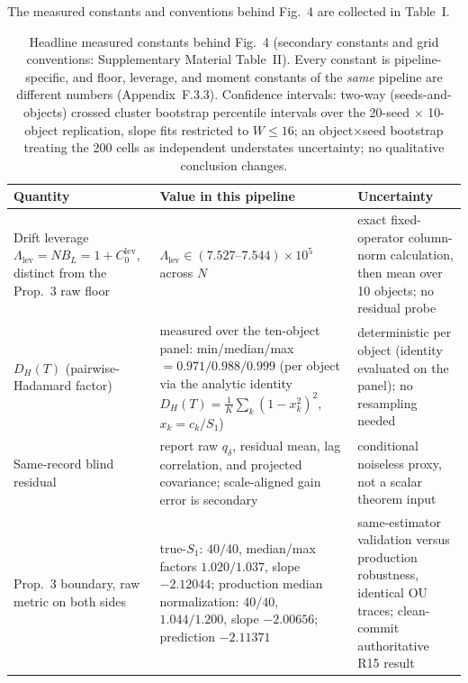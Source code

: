 The measured constants and conventions behind Fig.~4 are collected in Table~I.

\begin{table}[!t]
\centering
\caption{Headline measured constants behind Fig.~4 (secondary constants and grid conventions: Supplementary Material Table~II). Every constant is pipeline-specific, and floor, leverage, and moment constants of the \emph{same} pipeline are different numbers (Appendix~F.3.3). Confidence intervals: two-way (seeds-and-objects) crossed cluster bootstrap percentile intervals over the 20-seed $\times$ 10-object replication, slope fits restricted to $W\le16$; an object$\times$seed bootstrap treating the 200 cells as independent understates uncertainty; no qualitative conclusion changes.}
\label{tab:constants}
\begin{tabular}{@{}p{}p{}p{}@{}}
\toprule
Quantity & Value in this pipeline & Uncertainty \\
\midrule
Drift leverage $\Lambda_{\mathrm{lev}}=NB_L=1+C_0^{\mathrm{lev}}$, distinct from the Prop.~3 raw floor & $\Lambda_{\mathrm{lev}} \in (7.527\text{--}7.544)\times10^{5}$ across $N$ & exact fixed-operator column-norm calculation, then mean over 10 objects; no residual probe \\
\addlinespace
$D_H(T)$ (pairwise-Hadamard factor) & measured over the ten-object panel: min/median/max $=0.971/0.988/0.999$ (per object via the analytic identity $D_H(T)=\frac{1}{K}\sum_k(1-x_k^2)^2$, $x_k=c_k/S_1$) & deterministic per object (identity evaluated on the panel); no resampling needed \\
\addlinespace
Same-record blind residual & report raw $q_\delta$, residual mean, lag correlation, and projected covariance; scale-aligned gain error is secondary & conditional noiseless proxy, not a scalar theorem input \\
\addlinespace
Prop.~3 boundary, raw metric on both sides & true-$S_1$: $40/40$, median/max factors $\mathbf{1.020}/1.037$, slope $-2.12044$; production median normalization: $40/40$, $1.044/1.200$, slope $-2.00656$; prediction $-2.11371$ & same-estimator validation versus production robustness, identical OU traces; clean-commit authoritative R15 result \\
\bottomrule
\end{tabular}
\end{table}

